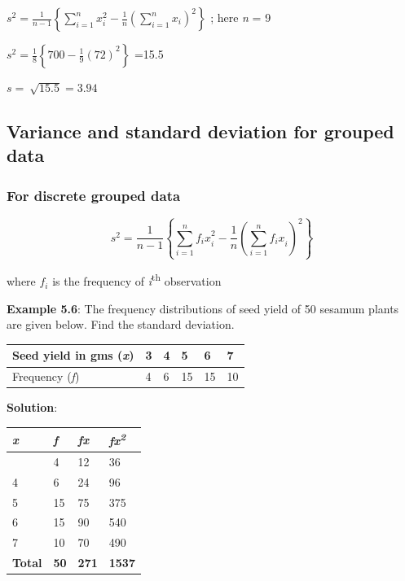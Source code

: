 \documentclass[
]{book}
\begin{document}
\(s^{2} = \frac{1}{n - 1}\left\{ \sum_{i = 1}^{n}{x_{i}^{2} - \frac{1}{n}}\left( \sum_{i = 1}^{n}x_{i} \right)^{2} \right\}\)
; here \emph{n} = 9

\(s^{2} = \frac{1}{8}\left\{ 700 - {\frac{1}{9}\left( 72 \right)}^{2} \right\}\)
=15.5

\(s = \ \sqrt{15.5} = 3.94\)

\subsection{Variance and standard deviation for grouped data}\label{variance-and-standard-deviation-for-grouped-data}

\subsubsection{For discrete grouped data}\label{for-discrete-grouped-data}

\[s^{2} = \frac{1}{n - 1}\left\{ \sum_{i = 1}^{n}{{f_{i}x}_{i}^{2} - \frac{1}{n}}\left( \sum_{i = 1}^{n}{f_{i}x}_{i} \right)^{2} \right\}\]

where \(f_{i}\) is the frequency of \emph{i}\textsuperscript{th} observation

\textbf{Example 5.6}: The frequency distributions of seed yield of 50 sesamum
plants are given below. Find the standard deviation.

\begin{longtable}[]{@{}llllll@{}}
\toprule\noalign{}
Seed yield in gms (\emph{x}) & 3 & 4 & 5 & 6 & 7 \\
\midrule\noalign{}
\endhead
\bottomrule\noalign{}
\endlastfoot
Frequency (\emph{f}) & 4 & 6 & 15 & 15 & 10 \\
\end{longtable}

\textbf{Solution}:

\begin{longtable}[]{@{}llll@{}}
\toprule\noalign{}
\textbf{\emph{x}} & \textbf{\emph{f}} & \textbf{\emph{fx}} & \textbf{\emph{fx\textsuperscript{2}}} \\
\midrule\noalign{}
\endhead
\bottomrule\noalign{}
\endlastfoot
3 & 4 & 12 & 36 \\
4 & 6 & 24 & 96 \\
5 & 15 & 75 & 375 \\
6 & 15 & 90 & 540 \\
7 & 10 & 70 & 490 \\
\textbf{Total} & \textbf{50} & \textbf{271} & \textbf{1537} \\
\end{longtable}
\end{document}
